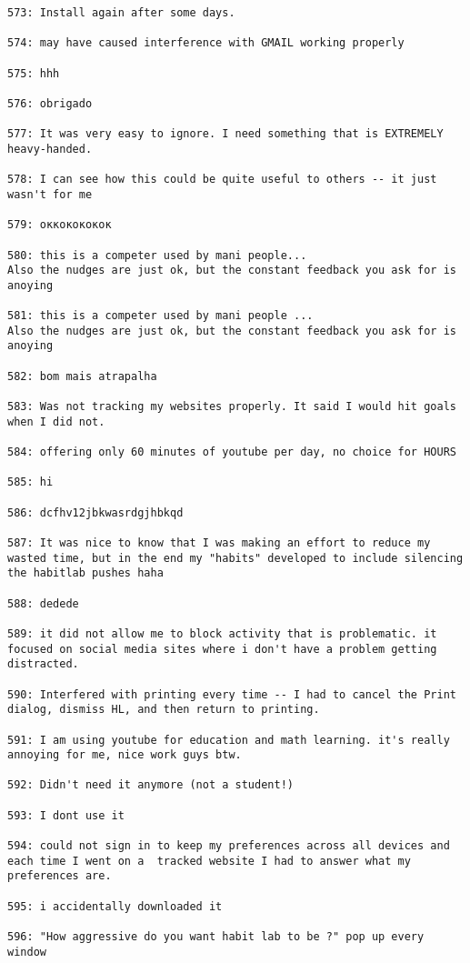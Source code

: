\begin{lstlisting}[breaklines]
573: Install again after some days.

574: may have caused interference with GMAIL working properly

575: hhh

576: obrigado

577: It was very easy to ignore. I need something that is EXTREMELY heavy-handed.

578: I can see how this could be quite useful to others -- it just wasn't for me

579: оккокококок

580: this is a competer used by mani people... 
Also the nudges are just ok, but the constant feedback you ask for is anoying

581: this is a competer used by mani people ... 
Also the nudges are just ok, but the constant feedback you ask for is anoying

582: bom mais atrapalha

583: Was not tracking my websites properly. It said I would hit goals when I did not.

584: offering only 60 minutes of youtube per day, no choice for HOURS

585: hi

586: dcfhv12jbkwasrdgjhbkqd

587: It was nice to know that I was making an effort to reduce my wasted time, but in the end my "habits" developed to include silencing the habitlab pushes haha

588: dedede

589: it did not allow me to block activity that is problematic. it focused on social media sites where i don't have a problem getting distracted.

590: Interfered with printing every time -- I had to cancel the Print dialog, dismiss HL, and then return to printing.

591: I am using youtube for education and math learning. it's really annoying for me, nice work guys btw.

592: Didn't need it anymore (not a student!)

593: I dont use it

594: could not sign in to keep my preferences across all devices and each time I went on a  tracked website I had to answer what my preferences are.

595: i accidentally downloaded it

596: "How aggressive do you want habit lab to be ?" pop up every window


\end{lstlisting}
